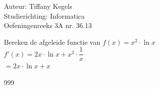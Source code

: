 \documentclass[a4paper]{article}
\begin{document}
  
\noindent \large Auteur: Tiffany Kegels \\
\noindent \large Studierichting: Informatica\\
\noindent \large Oefeningenreeks 3A nr. 36.13\\

\medskip

\normalsize

Bereken de afgeleide functie van $f(x) = x^2 \cdot \ln x$\\

$f'(x) = 2x \cdot \ln x + x^2 \cdot \dfrac{1}{x}$\\

$= 2x \cdot \ln x + x $\\

\begin{thebibliography}{999}

\end{thebibliography}
\end{document}
